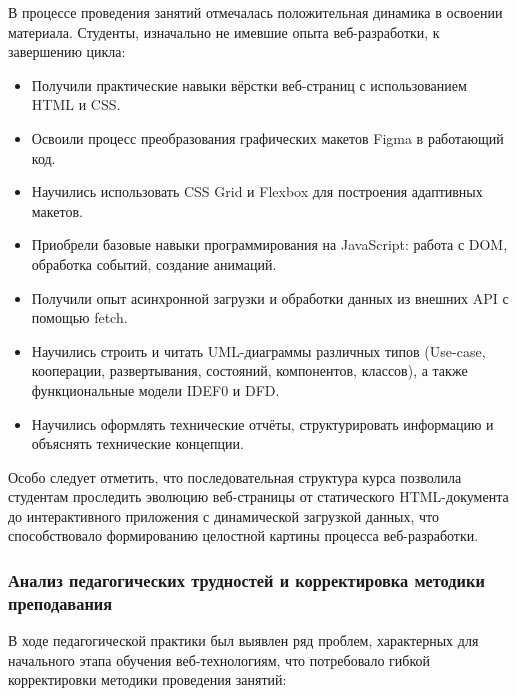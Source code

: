 В процессе проведения занятий отмечалась положительная динамика в освоении материала. Студенты, изначально не имевшие опыта веб-разработки, к завершению цикла:
\begin{itemize}
    \item Получили практические навыки вёрстки веб-страниц с использованием HTML и CSS.
    \item Освоили процесс преобразования графических макетов Figma в работающий код.
    \item Научились использовать CSS Grid и Flexbox для построения адаптивных макетов.
    \item Приобрели базовые навыки программирования на JavaScript: работа с DOM, обработка событий, создание анимаций.
    \item Получили опыт асинхронной загрузки и обработки данных из внешних API с помощью fetch.
    \item Научились строить и читать UML-диаграммы различных типов (Use-case, кооперации, развертывания, состояний, компонентов, классов), а также функциональные модели IDEF0 и DFD.
    \item Научились оформлять технические отчёты, структурировать информацию и объяснять технические концепции.
\end{itemize}

Особо следует отметить, что последовательная структура курса позволила студентам проследить эволюцию веб-страницы от статического HTML-документа до интерактивного приложения с динамической загрузкой данных, что способствовало формированию целостной картины процесса веб-разработки.

\subsubsection{Анализ педагогических трудностей и корректировка методики преподавания}

В ходе педагогической практики был выявлен ряд проблем, характерных для начального этапа обучения веб-технологиям, что потребовало гибкой корректировки методики проведения занятий:

